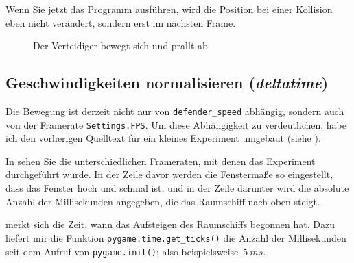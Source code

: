 Wenn Sie jetzt das Programm ausführen, wird die Position bei einer Kollision eben nicht verändert, sondern erst im nächsten Frame.

\begin{figure}[H]
\begin{center}
\caption{Der Verteidiger bewegt sich und prallt ab}\label{picBewegung01}
\end{center}
\end{figure}

\subsection{Geschwindigkeiten normalisieren (\emph{deltatime})}
Die Bewegung ist derzeit nicht nur von \texttt{defender\_speed} abhängig, sondern auch von der Framerate \texttt{Settings.FPS}. Um diese Abhängigkeit zu verdeutlichen, habe ich den vorherigen Quelltext für ein kleines Experiment umgebaut (siehe ).

In  sehen Sie die unterschiedlichen Frameraten, mit denen das Experiment durchgeführt wurde. In der Zeile davor werden die Fenstermaße so eingestellt, dass das Fenster hoch und schmal ist, und in der Zeile darunter wird die absolute Anzahl der Millisekunden angegeben, die das Raumschiff nach oben steigt.

 merkt sich die Zeit, wann das Aufsteigen des Raumschiffs begonnen hat. Dazu liefert mir die Funktion \texttt{pygame.time.get\_ticks()} die Anzahl der Millisekunden seit dem Aufruf von \texttt{pygame.init()}; also beispielsweise~$5~ms$.

